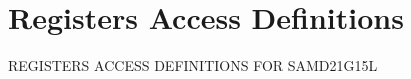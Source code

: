 \hypertarget{group___s_a_m_d21_g15_l__reg}{}\section{Registers Access Definitions}
\label{group___s_a_m_d21_g15_l__reg}
R\+E\+G\+I\+S\+T\+E\+RS A\+C\+C\+E\+SS D\+E\+F\+I\+N\+I\+T\+I\+O\+NS F\+OR S\+A\+M\+D21\+G15L 